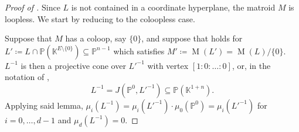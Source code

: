 \documentclass[12pt,a4paper,english]{scrartcl}
\newcommand{\KK}{\mathbb{K}}
\newcommand{\PP}{\mathbb{P}}
\DeclareMathOperator{\Matroid}{M}
\begin{document}
\begin{proof}[Proof of ]
    
    Since $L$ is not contained in a coordinate hyperplane, the matroid $M$ is loopless. We start by reducing to the coloopless case.

    Suppose that $M$ has a coloop, say $\{0\}$, and suppose that  holds for $L' \coloneq L \cap \PP(\KK^{E\setminus\{0\}}) \subseteq \PP^{n-1}$ which satisfies $M' \coloneq \Matroid(L') = \Matroid(L)/\{0\}$. $L^{-1}$ is then a projective cone over $L'^{-1}$ with vertex $[1:0:\dots:0]$, or, in the notation of ,
    \[
    L^{-1} = J(\PP^0,L'^{-1}) \subseteq \PP(\KK^{1+n}).
    \]
    Applying said lemma, $\mu_i(L^{-1}) = \mu_i(L'^{-1})\cdot \mu_0(\PP^0) = \mu_i(L'^{-1})$ for $i=0,\dots,d-1$ and $\mu_d(L^{-1}) = 0$.
    
    

\end{proof}
\end{document}
